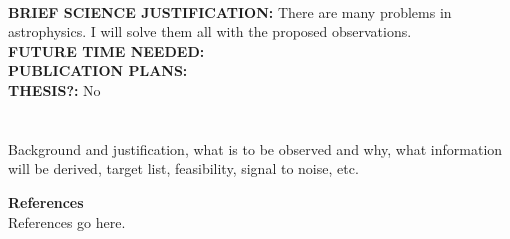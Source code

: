 \documentclass[11pt]{article}
\begin{document}
\smallskip\\
\textbf{BRIEF SCIENCE JUSTIFICATION:} There are many problems in astrophysics. I will solve them all with the proposed observations.%
\smallskip\\
\textbf{FUTURE TIME NEEDED:} %
\smallskip\\
\textbf{PUBLICATION PLANS:} %
\smallskip\\
\textbf{THESIS?:} No %



\newpage


\section*{}

Background and justification, what is to be observed and why, what information will be derived, target list, feasibility, signal to noise, etc.

 
%
\smallskip
\noindent\textbf{References}
\smallskip\\

References go here.
\end{document}
